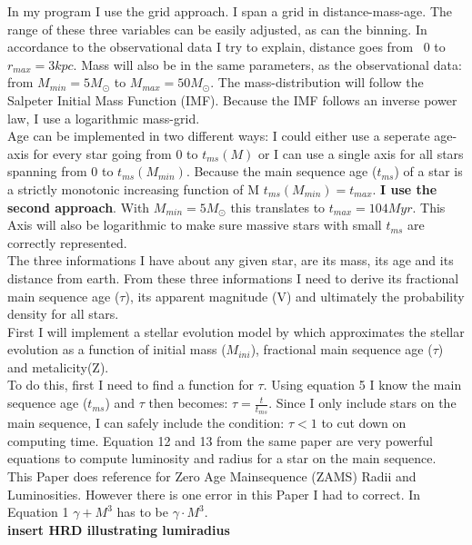 \documentclass[a4paper,10pt]{article}
\begin{document}
 In my program I use the grid approach. I span a grid in distance-mass-age. The range of these three
 variables can be easily adjusted, as can the binning. In accordance to the observational data I try to explain, distance goes from \
 0 to $r_{max}=3kpc$. Mass will also be in the same parameters, as the observational data:
 from $M_{min}=5M_\odot$ to $M_{max}=50M_\odot$. The mass-distribution will follow the Salpeter Initial Mass Function (IMF)\citep[see][]{1955ApJ...121..161S}.
 Because the IMF follows an inverse power law, I use a logarithmic mass-grid.\\
 Age can be implemented in two different ways: I could either use a seperate age-axis for every star going from 0 to $t_{ms}(M)$ or I can
 use a single axis for all stars spanning from 0 to $t_{ms}(M_{min})$. Because the main sequence age ($t_{ms}$) of a star 
 is a strictly monotonic increasing function of M $t_{ms}(M_{min})=t_{max}$. \textbf{I use the second approach}. With $M_{min}=5M_\odot$ this 
 translates to $t_{max}=104Myr$. This Axis will also be logarithmic to make sure massive stars with small $t_{ms}$ are correctly
 represented. \\
 The three informations I have about any given star, are its mass, its age and its distance from earth. From these three informations
 I need to derive its fractional main sequence age ($\tau$), its apparent magnitude (V) and ultimately the probability density
 for all stars.\\ 
 First I will implement a stellar evolution model by \citet*{2000MNRAS.315..543H} which approximates the stellar evolution as a 
 function of initial mass ($M_{ini}$), fractional main sequence age ($\tau$) and metalicity(Z). \\
 To do this, first I need to find a function for $\tau$. Using equation 5 \citep[page 547]{2000MNRAS.315..543H} I know the main sequence age 
 ($t_{ms}$) and $\tau$ then becomes: $\tau=\frac{t}{t_{ms}}$. Since I only include stars on the main sequence, I can safely include
 the condition: $\tau<1$ to cut down on computing time.
 Equation 12 and 13 from the same paper are very powerful equations to compute luminosity and radius for a star on the main sequence.\\
 This Paper does reference \citet*{1996MNRAS.281..257T} for Zero Age Mainsequence (ZAMS) Radii and Luminosities. However there is one 
 error in this Paper I had to correct. In Equation 1 $\gamma + M^3$ has to be $\gamma \cdot M^3$.\\
 \textbf{insert HRD illustrating lumiradius}\\
 
\end{document}
